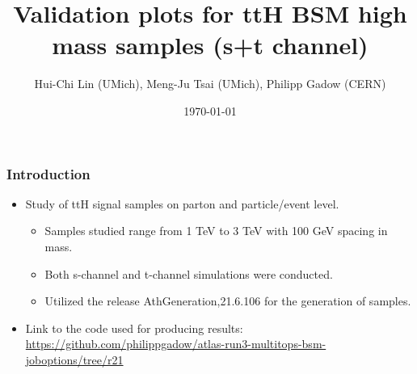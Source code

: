 \documentclass{beamer}
\begin{document}
\begin{frame}
\title{Validation plots for ttH BSM high mass samples (s+t channel)}
\author{Hui-Chi Lin (UMich), Meng-Ju Tsai (UMich), Philipp Gadow (CERN)}
\date{\today}
\maketitle
\end{frame}
\begin{frame}
\frametitle{Introduction}
\begin{itemize}
\item Study of ttH signal samples on parton and particle/event level.
\begin{itemize}
\item Samples studied range from 1 TeV to 3 TeV with 100 GeV spacing in mass.
\item Both s-channel and t-channel simulations were conducted.
\item Utilized the release AthGeneration,21.6.106 for the generation of samples.
\end{itemize}
\item Link to the code used for producing results: \url{https://github.com/philippgadow/atlas-run3-multitops-bsm-joboptions/tree/r21}
\end{itemize}
\end{frame}
\end{document}
